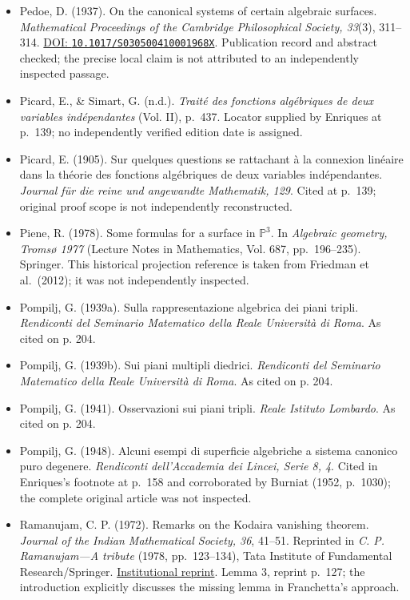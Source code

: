 \begin{sloppypar}
\begin{itemize}
\item Pedoe, D. (1937). On the canonical systems of certain algebraic surfaces. \emph{Mathematical Proceedings of the Cambridge Philosophical Society, 33}(3), 311--314. \href{https://doi.org/10.1017/S030500410001968X}{DOI: \nolinkurl{10.1017/S030500410001968X}}. Publication record and abstract checked; the precise local claim is not attributed to an independently inspected passage.

\item Picard, E., \& Simart, G. (n.d.). \emph{Traité des fonctions algébriques de deux variables indépendantes} (Vol. II), p.~437. Locator supplied by Enriques at p.~139; no independently verified edition date is assigned.

\item Picard, E. (1905). Sur quelques questions se rattachant à la connexion linéaire dans la théorie des fonctions algébriques de deux variables indépendantes. \emph{Journal für die reine und angewandte Mathematik, 129}. Cited at p.~139; original proof scope is not independently reconstructed.

\item Piene, R. (1978). Some formulas for a surface in \(\mathbb P^3\). In \emph{Algebraic geometry, Tromsø 1977} (Lecture Notes in Mathematics, Vol. 687, pp.~196--235). Springer. This historical projection reference is taken from Friedman et al.~(2012); it was not independently inspected.

\item Pompilj, G. (1939a). Sulla rappresentazione algebrica dei piani tripli. \emph{Rendiconti del Seminario Matematico della Reale Universit\`a di Roma}. As cited on p. 204.

\item Pompilj, G. (1939b). Sui piani multipli diedrici. \emph{Rendiconti del Seminario Matematico della Reale Universit\`a di Roma}. As cited on p. 204.

\item Pompilj, G. (1941). Osservazioni sui piani tripli. \emph{Reale Istituto Lombardo}. As cited on p. 204.

\item Pompilj, G. (1948). Alcuni esempi di superficie algebriche a sistema canonico puro degenere. \emph{Rendiconti dell'Accademia dei Lincei, Serie 8, 4}. Cited in Enriques's footnote at p.~158 and corroborated by Burniat (1952, p.~1030); the complete original article was not inspected.

\item Ramanujam, C. P. (1972). Remarks on the Kodaira vanishing theorem. \emph{Journal of the Indian Mathematical Society, 36}, 41--51. Reprinted in \emph{C. P. Ramanujam---A tribute} (1978, pp.~123--134), Tata Institute of Fundamental Research/Springer. \href{https://mathweb.tifr.res.in/Documents/Publications/Studies/CP-Ramanujam-A-Tribute.pdf}{Institutional reprint}. Lemma 3, reprint p.~127; the introduction explicitly discusses the missing lemma in Franchetta's approach.


\end{itemize}
\end{sloppypar}
